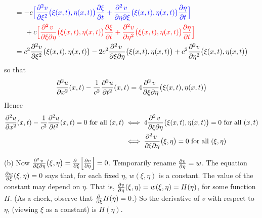 \begin{solution}
\begin{align*}
&=-c\textcolor{blue}{\Big[\frac{\partial^2 v}{\partial \xi^2}
                                     \big(\xi(x,t),\eta(x,t)\big)
                                                      \pdiff{\xi}{t}
+\frac{\partial^2\hfil v\hfil\,}{\partial\eta\partial \xi}
                                      \big(\xi(x,t),\eta(x,t)\big)
                               \pdiff{\eta}{t}\Big]} \\&\hskip0.2in
+c\textcolor{red}{\Big[\frac{\partial^2\hfil v\hfil\,}{\partial\xi\partial\eta}
                    \big(\xi(x,t),\eta(x,t)\big)
                   \pdiff{\xi}{t}
+\frac{\partial^2 v}{\partial\eta^2}\big(\xi(x,t),\eta(x,t)\big)
   \pdiff{\eta}{t}\Big]}\\
&=c^2\frac{\partial^2 v}{\partial \xi^2}\big(\xi(x,t),\eta(x,t)\big)
-2c^2\frac{\partial^2\hfil v\hfil\,}{\partial\xi\partial\eta}
                                        \big(\xi(x,t),\eta(x,t)\big)
+c^2\frac{\partial^2 v}{\partial\eta^2}\big(\xi(x,t),\eta(x,t)\big)
\end{align*}
so that 
\begin{equation*}
\frac{\partial^2 u}{\partial x^2}(x,t)
-\frac{1}{c^2}\frac{\partial^2 u}{\partial t^2}(x,t)
=4\frac{\partial^2\hfil v\hfil\,}{\partial\xi\partial\eta}
      \big(\xi(x,t),\eta(x,t)\big)
\end{equation*}
Hence
\begin{align*}
\frac{\partial^2 u}{\partial x^2}(x,t)
-\frac{1}{c^2}\frac{\partial^2 u}{\partial t^2}(x,t)=0
\text{ for all }(x,t)
&\iff
4\frac{\partial^2\hfil v\hfil\,}{\partial\xi\partial\eta}
      \big(\xi(x,t),\eta(x,t)\big)=0\hbox{ for all }(x,t)\\
&\iff
\frac{\partial^2\hfil v\hfil\,}{\partial\xi\partial\eta}
      \big(\xi,\eta\big)=0\text{ for all }(\xi,\eta)
\end{align*}

(b)
Now $\frac{\partial^2\hfil v\hfil\,}{\partial\xi\partial\eta}\big(\xi,\eta\big)
=\frac{\partial\hfill}{\partial\xi}
\Big[\frac{\partial v}{\partial\eta}\Big]=0$.
Temporarily rename $\pdiff{v}{\eta}=w$. The equation
$\pdiff{w}{\xi}(\xi,\eta)=0$ says that, for each fixed
$\eta$, $w(\xi,\eta)$ is a constant. The value of the constant may depend
on $\eta$. That is, $\pdiff{v}{\eta}(\xi,\eta)=w(\xi,\eta)
=H(\eta)$, for some function $H$. (As a check, observe that
$\pdiff{}{\xi}H(\eta)=0$.) 
So the derivative of $v$ with respect to $\eta$,
(viewing $\xi$ as a constant) is $H(\eta)$. 


\end{solution}
